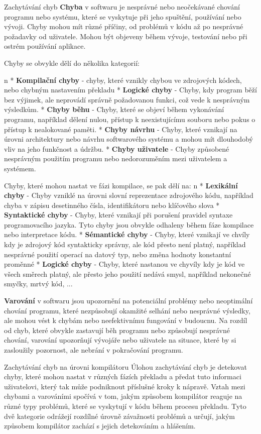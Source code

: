 \chap Zachytávání chyb
{\bf Chyba} v softwaru je nesprávné nebo neočekávané chování programu nebo systému, které se vyskytuje při jeho spuštění, používání nebo vývoji. Chyby mohou mít různé příčiny, od problémů v kódu až po nesprávné požadavky od uživatele. Mohou být objeveny během vývoje, testování nebo při ostrém používání aplikace.

Chyby se obvykle dělí do několika kategorií:

\begitems\style n
* {\bf Kompilační chyby} - chyby, které vznikly chybou ve zdrojových kódech, nebo chybným nastavením překladu
* {\bf Logické chyby} - Chyby, kdy program běží bez výjimek, ale neprovádí správně požadovanou funkci, což vede k nesprávným výsledkům.
* {\bf Chyby běhu} - Chyby, které se objeví během vykonávání programu, například dělení nulou, přístup k neexistujícímu souboru nebo pokus o přístup k nealokované paměti.
* {\bf Chyby návrhu} - Chyby, které vznikají na úrovni architektury nebo návrhu softwarového systému a mohou mít dlouhodobý vliv na jeho funkčnost a údržbu.
* {\bf Chyby uživatele} - Chyby způsobené nesprávným použitím programu nebo nedorozuměním mezi uživatelem a systémem.
\enditems

Chyby, které mohou nastat ve fázi kompilace, se pak dělí na:
\begitems\style n
* {\bf Lexikální chyby} - Chyby vzniklé na úrovni slovní reprezentace zdrojového kódu, například chyba v zápisu desetinného čísla, identifikátoru nebo klíčového slova
* {\bf Syntaktické chyby} - Chyby, které vznikají při porušení pravidel syntaxe programovacího jazyka. Tyto chyby jsou obvykle odhaleny během fáze kompilace nebo interpretace kódu.
* {\bf Sémantické chyby} - Chyby, které vznikají ve chvíly kdy je zdrojový kód syntakticky správny, ale kód přesto není platný, například nesprávné použití operací na datový typ, nebo změna hodnoty konstantní proměnné
* {\bf Logické chyby} - Chyby, které nastanou ve chyvíly kdy je kód ve všech směrech platný, ale přesto jeho použití nedává smysl, například nekonečné smyčky, mrtvý kód, ...
\enditems

{\bf Varování} v softwaru jsou upozornění na potenciální problémy nebo neoptimální chování programu, které nezpůsobují okamžité selhání nebo nesprávné výsledky, ale mohou vést k chybám nebo neefektivnímu fungování v budoucnu. Na rozdíl od chyb, které obvykle zastavují běh programu nebo způsobují nesprávné chování, varování upozorňují vývojáře nebo uživatele na situace, které by si zasloužily pozornost, ale nebrání v pokračování programu.

\sec Zachytávání chyb na úrovni kompilátoru
Úlohou zachytávání chyb je detekovat chyby, které mohou nastat v různých fázích překladu a předat tuto informaci uživatelovi, který tak může podniknout příslušné kroky k nápravě. Vztah mezi chybami a varováními spočívá v tom, jakým způsobem kompilátor reaguje na různé typy problémů, které se vyskytují v kódu během procesu překladu. Tyto dvě kategorie odrážejí rozdílné úrovně závažnosti problémů a určují, jakým způsobem kompilátor zachází s jejich detekováním a hlášením.

